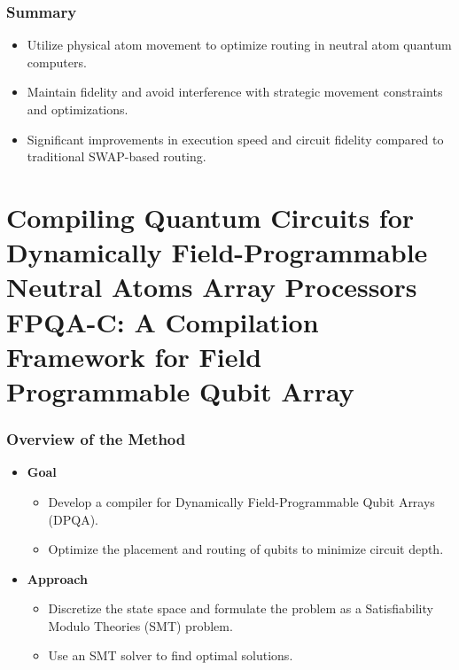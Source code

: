 \documentclass[18 pt]{beamer}
\begin{document}
\begin{frame}
    \frametitle{Summary}
    \begin{itemize}
        \item Utilize physical atom movement to optimize routing in neutral atom quantum computers.
        \item Maintain fidelity and avoid interference with strategic movement constraints and optimizations.
        \item Significant improvements in execution speed and circuit fidelity compared to traditional SWAP-based routing.
    \end{itemize}
\end{frame}

\section{Compiling Quantum Circuits for Dynamically Field-Programmable Neutral Atoms Array Processors\\FPQA-C: A Compilation Framework for Field Programmable Qubit Array}
\begin{frame}
    \frametitle{Overview of the Method}
    \begin{itemize}
        \item \textbf{Goal}
        \begin{itemize}
            \item Develop a compiler for Dynamically Field-Programmable Qubit Arrays (DPQA).
            \item Optimize the placement and routing of qubits to minimize circuit depth.
        \end{itemize}
        \item \textbf{Approach}
        \begin{itemize}
            \item Discretize the state space and formulate the problem as a Satisfiability Modulo Theories (SMT) problem.
            \item Use an SMT solver to find optimal solutions.
        \end{itemize}
    \end{itemize}
\end{frame}
\end{document}
